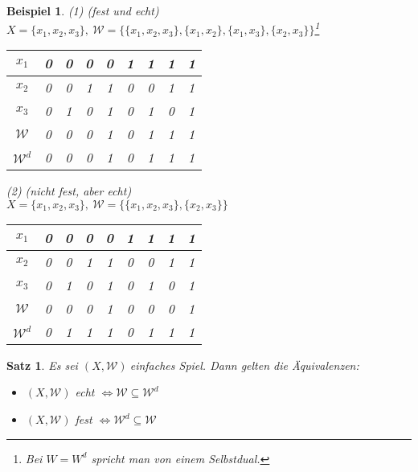 \documentclass[ngerman]{scrartcl}
\theoremstyle{custom}
\newtheorem{mex}[mdef]{Beispiel}
\newtheorem{ms}[mdef]{Satz}
\newcommand{\0}{\mathbf{0}}
\newcommand{\1}{\mathbf{L}}
\newcommand{\sg}{$(X,\mathcal{W})~$}
\newcommand{\W}{\mathcal{W}}
\begin{document}
\begin{mex}
(1) (fest und echt) \\
$X = \{x_1,x_2,x_3\}, ~\W =
\{\{x_1,x_2,x_3\},\{x_1,x_2\},\{x_1,x_3\},\{x_2,x_3\}\}$\footnote{Bei $W =
  W^d$ spricht man von einem Selbstdual.}
\begin{table}[h]
\begin{tabular}[h]{|c||c|c|c|c|c|c|c|c|}
\hline $x_1$ & 0 & 0 & 0 & 0 & 1 & 1 & 1 & 1\\
\hline $x_2$ & 0 & 0 & 1 & 1 & 0 & 0 & 1 & 1\\
\hline $x_3$ & 0 & 1 & 0 & 1 & 0 & 1 & 0 & 1\\
\hline $\W$ & 0 & 0 & 0 &1 & 0 & 1 & 1 & 1\\
\hline $\W^d$ & 0 & 0 & 0 & 1 & 0 & 1 & 1 & 1\\
\hline
\end{tabular}
\end{table}

(2) (nicht fest, aber echt)\\
$X = \{x_1, x_2,x_3\}, ~\W = \{\{x_1, x_2, x_3\},\{x_2,x_3\}\}$
\begin{table}[h]
\begin{tabular}[h]{|c||c|c|c|c|c|c|c|c|}
\hline $x_1$ & 0 & 0 & 0 & 0 & 1 & 1 & 1 & 1\\
\hline $x_2$ & 0 & 0 & 1 & 1 & 0 & 0 & 1 & 1\\
\hline $x_3$ & 0 & 1 & 0 & 1 & 0 & 1 & 0 & 1\\
\hline $\W$ & 0 & 0 & 0 &1 & 0 & 0 & 0 & 1\\
\hline $\W^d$ & 0 & 1 & 1 & 1 & 0 & 1 & 1 & 1\\
\hline
\end{tabular}
\end{table}
\end{mex}

\begin{ms}
Es sei \sg einfaches Spiel. Dann gelten die \"Aquivalenzen:
\begin{itemize}
\item[(1)] $(X,\W)$ echt $\Leftrightarrow \W \subseteq \W^d$
\item[(2)] $(X,\W)$ fest $\Leftrightarrow \W^d \subseteq \W$
\end{itemize}
\end{ms}
\end{document}
